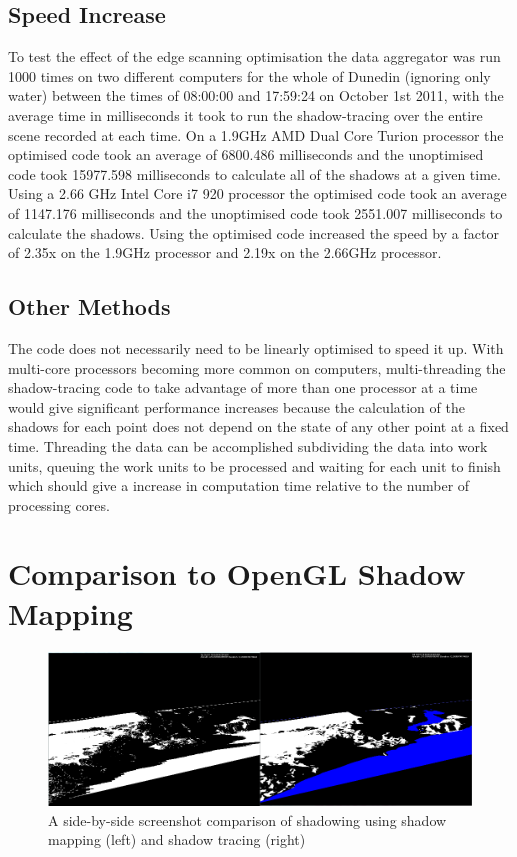 \documentclass[12pt]{report}
\begin{document}
\subsection{Speed Increase}
To test the effect of the edge scanning optimisation the data aggregator was run 1000 times on two different computers for the whole of Dunedin (ignoring only water) between the times of 08:00:00 and 17:59:24 on October 1st 2011, with the average time in milliseconds it took to run the shadow-tracing over the entire scene recorded at each time. On a 1.9GHz AMD Dual Core Turion processor the optimised code took an average of 6800.486 milliseconds and the unoptimised code took 15977.598 milliseconds to calculate all of the shadows at a given time. Using a 2.66 GHz Intel Core i7 920 processor the optimised code took an average of 1147.176 milliseconds and the unoptimised code took 2551.007 milliseconds to calculate the shadows. Using the optimised code increased the speed by a factor of 2.35x on the 1.9GHz processor and 2.19x on the 2.66GHz processor.

\subsection{Other Methods}
The code does not necessarily need to be linearly optimised to speed it up. With multi-core processors becoming more common on computers, multi-threading the shadow-tracing code to take advantage of more than one processor at a time would give significant performance increases because the calculation of the shadows for each point does not depend on the state of any other point at a fixed time. Threading the data can be accomplished subdividing the data into work units, queuing the work units to be processed and waiting for each unit to finish which should give a increase in computation time relative to the number of processing cores.

\section{Comparison to OpenGL Shadow Mapping}
\begin{figure}[h]
\centering
\includegraphics[width=\textwidth]{aggregatorvsshadowmapping.png}
\caption{A side-by-side screenshot comparison of shadowing using shadow mapping (left) and shadow tracing (right)}
\label{image:aggregatorvsshadowmapping}
\end{figure}
\end{document}
